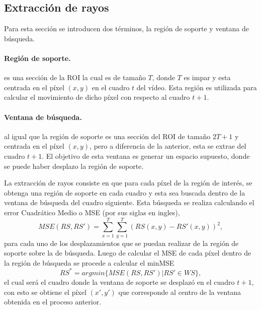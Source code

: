 	\subsection{Extracción de rayos}
	\label{algoritmo:ext_rayos}
	Para esta sección se introducen dos términos, la región de soporte y ventana de búsqueda.
	\paragraph{Región de soporte.} es una sección de la ROI la cual es de tamaño $T$, donde $T$ es impar y esta centrada en el píxel $(x,y)$ en el cuadro $t$ del vídeo. Esta región es utilizada para calcular el movimiento de dicho píxel con respecto al cuadro $t+1$.
	\paragraph{Ventana de búsqueda.} al igual que la región de soporte es una sección del ROI de tamaño $2T+1$ y centrada en el píxel $(x,y)$, pero a diferencia de la anterior, esta se extrae del cuadro $t+1$. El objetivo de esta ventana es generar un espacio supuesto, donde se puede haber desplazo la región de soporte.
		
	La extracción de rayos consiste en que para cada píxel de la región de interés, se obtenga una región de soporte en cada cuadro y esta sea buscada dentro de la ventana de búsqueda del cuadro siguiente. Esta búsqueda se realiza calculando el error Cuadrático Medio o MSE (por sus siglas en ingles), \begin{equation}\label{algoritmo:eq:mse}	
			MSE(\mathit{RS},\mathit{RS'}) = \sum_{x=1}^{T} \sum_{y=1}^{T} (\mathit{RS}(x,y) - \mathit{RS'}(x,y))^2,
		\end{equation} 
	para cada uno de los desplazamientos que se puedan realizar de la región de soporte sobre la de búsqueda. Luego de calcular el MSE de cada píxel dentro de la región de búsqueda se procede a calcular el minMSE
	\begin{equation}
		RS^* = argmin\{MSE(RS,RS') | RS' \in WS\},
	\end{equation}		
	el cual será el cuadro donde la ventana de soporte se desplazó en el cuadro $t+1$, con esto se obtiene el píxel $(x',y')$ que corresponde al centro de la ventana obtenida en el proceso anterior.
	
